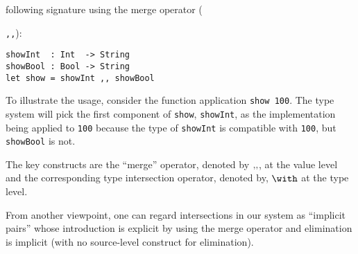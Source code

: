 following signature using the merge operator ({\lstinline{,,}):
\begin{lstlisting}
showInt  : Int  -> String
showBool : Bool -> String
let show = showInt ,, showBool
\end{lstlisting}

To illustrate the usage, consider the function application \lstinline{show 100}.
The type system will pick the first component of \lstinline{show},
\lstinline{showInt}, as the implementation being applied to \lstinline{100}
because the type of \lstinline{showInt} is compatible with \lstinline{100}, but
\lstinline{showBool} is not.


The key constructs are the ``merge'' operator, denoted by $ ,\!, $, at the
value level and the corresponding type intersection operator, denoted by,
$ \intersects $ at the type level.

From another viewpoint, one can regard intersections in our system as ``implicit
pairs'' whose introduction is explicit by using the merge operator and
elimination is implicit (with no source-level construct for
elimination). 







}

